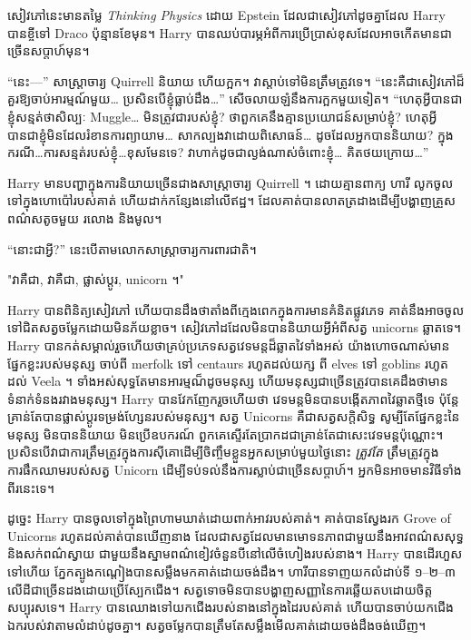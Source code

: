 សៀវភៅនេះមានតម្លៃ \emph{Thinking Physics} ដោយ Epstein ដែលជាសៀវភៅដូចគ្នាដែល Harry បានខ្ចីទៅ Draco ប៉ុន្មានខែមុន។ Harry បានឈប់បារម្ភអំពីការប្រើប្រាស់ខុសដែលអាចកើតមានជាច្រើនសប្តាហ៍មុន។

“នេះ—” សាស្ត្រាចារ្យ Quirrell និយាយ ហើយក្អក។ វាស្តាប់ទៅមិនត្រឹមត្រូវទេ។ “នេះគឺជាសៀវភៅដ៏គួរឱ្យចាប់អារម្មណ៍មួយ… ប្រសិនបើខ្ញុំធ្លាប់ដឹង…” សើចលាយឡំនឹងការក្អកមួយទៀត។ “ហេតុអ្វីបានជាខ្ញុំសន្មត់ថាសិល្បៈ Muggle… មិនត្រូវជារបស់ខ្ញុំ? ថាពួកគេនឹងគ្មានប្រយោជន៍សម្រាប់ខ្ញុំ? ហេតុអ្វីបានជាខ្ញុំមិនដែលរំខានការព្យាយាម… សាកល្បងវាដោយពិសោធន៍… ដូចដែលអ្នកបាននិយាយ? ក្នុងករណី…ការសន្មត់របស់ខ្ញុំ…ខុសមែនទេ? វា​ហាក់​ដូច​ជា​ល្ងង់​ណាស់​ចំពោះ​ខ្ញុំ… គិត​ថយ​ក្រោយ…”

Harry មានបញ្ហាក្នុងការនិយាយច្រើនជាងសាស្រ្តាចារ្យ Quirrell ។ ដោយគ្មានពាក្យ ហារី លូកចូលទៅក្នុងហោប៉ៅរបស់គាត់ ហើយដាក់កន្សែងនៅលើឥដ្ឋ។ ដែលគាត់បានលាតត្រដាងដើម្បីបង្ហាញគ្រួសពណ៌សតូចមួយ រលោង និងមូល។

“នោះជាអ្វី?” នេះ​បើ​តាម​លោក​សាស្ត្រាចារ្យ​ការពារ​ជាតិ។

"វាគឺជា, វាគឺជា, ផ្លាស់ប្តូរ, unicorn ។"

Harry បានពិនិត្យសៀវភៅ ហើយបានដឹងថាតាំងពីក្មេងពេកក្នុងការមានគំនិតផ្លូវភេទ គាត់នឹងអាចចូលទៅជិតសត្វចម្លែកដោយមិនភ័យខ្លាច។ សៀវភៅដដែលមិនបាននិយាយអ្វីអំពីសត្វ unicorns ឆ្លាតទេ។ Harry បានកត់សម្គាល់រួចហើយថាគ្រប់ប្រភេទសត្វវេទមន្តដ៏ឆ្លាតវៃទាំងអស់ យ៉ាងហោចណាស់មានផ្នែកខ្លះរបស់មនុស្ស ចាប់ពី merfolk ទៅ centaurs រហូតដល់យក្ស ពី elves ទៅ goblins រហូតដល់ Veela ។ ទាំងអស់សុទ្ធតែមានអារម្មណ៏ដូចមនុស្ស ហើយមនុស្សជាច្រើនត្រូវបានគេដឹងថាមានទំនាក់ទំនងរវាងមនុស្ស។ Harry បាន​វែកញែក​រួច​ហើយ​ថា វេទមន្ត​មិន​បាន​បង្កើត​ភាព​វៃឆ្លាត​ថ្មី​ទេ ប៉ុន្តែ​គ្រាន់​តែ​បាន​ផ្លាស់​ប្តូរ​ទម្រង់​ហ្សែន​របស់​មនុស្ស។ សត្វ Unicorns គឺជាសត្វសក្តិសិទ្ធ សូម្បីតែផ្នែកខ្លះនៃមនុស្ស មិនបាននិយាយ មិនប្រើឧបករណ៍ ពួកគេស្ទើរតែប្រាកដជាគ្រាន់តែជាសេះវេទមន្តប៉ុណ្ណោះ។ ប្រសិនបើវាជាការត្រឹមត្រូវក្នុងការស៊ីគោដើម្បីចិញ្ចឹមខ្លួនអ្នកសម្រាប់មួយថ្ងៃនោះ \emph{ត្រូវតែ} ត្រឹមត្រូវក្នុងការផឹកឈាមរបស់សត្វ Unicorn ដើម្បីទប់ទល់នឹងការស្លាប់ជាច្រើនសប្តាហ៍។ អ្នកមិនអាចមានវិធីទាំងពីរនេះទេ។

ដូច្នេះ Harry បានចូលទៅក្នុងព្រៃហាមឃាត់ដោយពាក់អាវរបស់គាត់។ គាត់បានស្វែងរក Grove of Unicorns រហូតដល់គាត់បានឃើញនាង ដែលជាសត្វដែលមានមោទនភាពជាមួយនឹងអាវពណ៌សសុទ្ធ និងសក់ពណ៌ស្វាយ ជាមួយនឹងស្នាមពណ៌ខៀវចំនួនបីនៅលើចំហៀងរបស់នាង។ Harry បានដើរហួសទៅហើយ ភ្នែកត្បូងកណ្តៀងបានសម្លឹងមកគាត់ដោយចង់ដឹង។ ហារី​បាន​ទាញ​យក​លំដាប់​ទី ១–២–៣ លើ​ដី​ជា​ច្រើន​ដង​ដោយ​ប្រើ​ស្បែក​ជើង។ សត្វ​ទោច​មិន​បាន​បង្ហាញ​សញ្ញា​នៃ​ការ​ឆ្លើយ​តប​ដោយ​ចិត្ត​សប្បុរស​ទេ។ Harry បាន​ឈោង​ទៅ​យក​ជើង​របស់​នាង​នៅ​ក្នុង​ដៃ​របស់​គាត់ ហើយ​បាន​ចាប់​យក​ជើង​ឯក​របស់​វា​តាម​លំដាប់​ដូច​គ្នា។ សត្វចម្លែកបានត្រឹមតែសម្លឹងមើលគាត់ដោយចង់ដឹងចង់ឃើញ។

